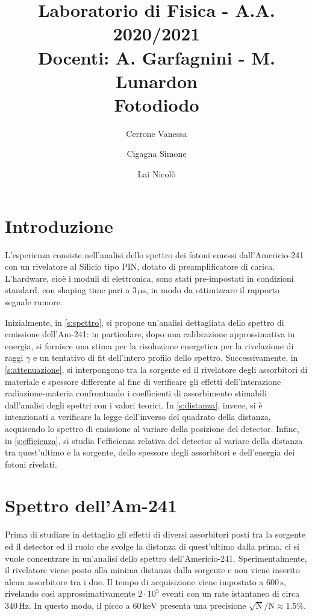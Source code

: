 \documentclass[twocolumn,10pt]{asme2ej}
\date{}
\title{{\huge\bfseries Laboratorio di Fisica} - {\LARGE A.A. 2020/2021} \\ 
    {\LARGE Docenti: A. Garfagnini - M. Lunardon} \\ {\Huge\bfseries Fotodiodo}}
\author{Cerrone Vanessa
    \affiliation{
    1200361\\
    vanessa.cerrone@studenti.unipd.it
    }	
}
\author{Cigagna Simone
    \affiliation{
	1193992\\
    simone.cigagna@studenti.unipd.it
    }	
}
\author{Lai Nicolò
    \affiliation{
	1193976\\
    nicolo.lai@studenti.unipd.it
    }	
}
\begin{document}
\maketitle    


\section{Introduzione}\label{s:introduzione}

L'esperienza consiste nell'analisi dello spettro dei fotoni emessi dall'Americio-241 con un rivelatore al Silicio tipo
PIN, dotato di preamplificatore di carica. L'hardware, cioè i moduli di elettronica, sono stati pre-impostati in
condizioni standard, con shaping time pari a $3\,\si{\micro\second}$, in modo da ottimizzare il rapporto segnale rumore.

Inizialmente, in \autoref{s:spettro}, si propone un'analisi dettagliata dello spettro di emissione dell'Am-241: in
particolare, dopo una calibrazione approssimativa in energia, si fornisce una stima per la risoluzione energetica per la
rivelazione di raggi $\gamma$ e un tentativo di fit dell'intero profilo dello spettro. Successivamente, in
\autoref{s:attenuazione}, si interpongono tra la sorgente ed il rivelatore degli assorbitori di materiale e spessore
differente al fine di verificare gli effetti dell'interazione radiazione-materia confrontando i coefficienti di
assorbimento stimabili dall'analisi degli spettri con i valori teorici. In \autoref{s:distanza}, invece, si è
intenzionati a verificare la legge dell'inverso del quadrato della distanza, acquisendo lo spettro di emissione al
variare della posizione del detector. Infine, in \autoref{s:efficienza}, si studia l'efficienza relativa del detector al
variare della distanza tra quest'ultimo e la sorgente, dello spessore degli assorbitori e dell'energia dei fotoni
rivelati.


\vspace{-20pt}
\section{Spettro dell'Am-241}\label{s:spettro}

Prima di studiare in dettaglio gli effetti di diversi assorbitori posti tra la sorgente ed il detector ed il ruolo che
svolge la distanza di quest'ultimo dalla prima, ci si vuole concentrare in un'analisi dello spettro dell'Americio-241.
Sperimentalmente, il rivelatore viene posto alla minima distanza dalla sorgente e non viene inserito alcun assorbitore
tra i due. Il tempo di acquisizione viene impostato a $600\,\si{\second}$, rivelando così approssimativamente $2 \cdot
10^5$ eventi con un rate istantaneo di circa $340\,\si{\hertz}$. In questo modo, il picco a
$60\,\si{\kilo\electronvolt}$ presenta una precisione $\sqrt{\text{N}}/\text{N} \approx 1.5\%$.
\end{document}
